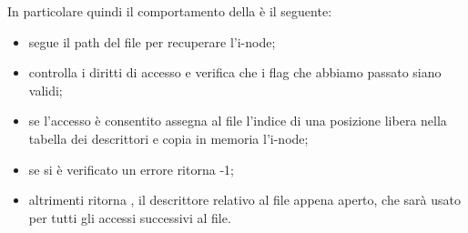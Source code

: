 In particolare quindi il comportamento della  è il seguente:
\begin{itemize}
    \item segue il path del file per recuperare l'i-node;
    \item controlla i diritti di accesso e verifica che i flag che abbiamo passato siano validi;
    \item se l'accesso è consentito assegna al file l'indice di una posizione libera nella tabella dei descrittori e copia in memoria l'i-node;
    \item se si è verificato un errore ritorna -1;
    \item altrimenti ritorna , il descrittore relativo al file appena aperto, che sarà usato per tutti gli accessi successivi al file.
\end{itemize}